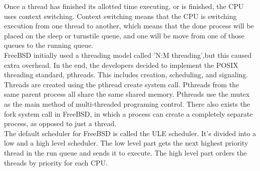 \documentclass[titlepage]{article}
\begin{document}
\begin{singlespace}
Once a thread has finished its allotted time executing, or is finished, the CPU uses context switching. Context switching means that the CPU is switching execution from one thread to another, which means that the done process will be placed on the sleep or turnstile queue, and one will be move from one of those queues to the running queue.\\
    FreeBSD initially used a threading model called 'N:M threading',but this caused extra overhead. In the end, the developers decided to implement the POSIX threading standard, pthreads. This includes creation, scheduling, and signaling. Threads are created using the pthread create system call. Pthreads from the same parent process all share the same shared memory. Pthreads use the mutex as the main method of multi-threaded programing control. There also exists the fork system call in FreeBSD, in which a process can create a completely separate process, as opposed to just a thread. \\
    The default scheduler for FreeBSD is called the ULE scheduler. It's divided into a low and a high level scheduler. The low level part gets the next highest priority thread in the run queue and sends it to execute. The high level part orders the threads by priority for each CPU. \cite{freebsdch4}\\


\end{singlespace}
\end{document}
